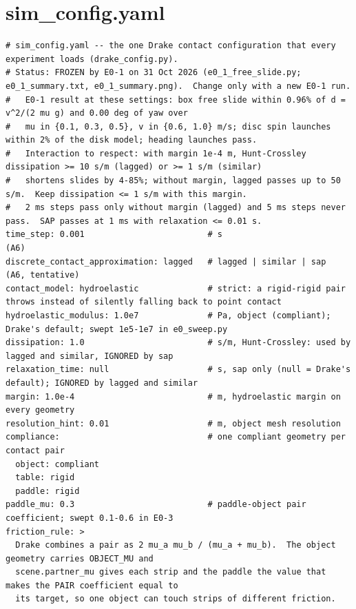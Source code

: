 \documentclass[10pt]{article}
\begin{document}
\section{sim\_config.yaml}
\begin{verbatim}
# sim_config.yaml -- the one Drake contact configuration that every experiment loads (drake_config.py).
# Status: FROZEN by E0-1 on 31 Oct 2026 (e0_1_free_slide.py; e0_1_summary.txt, e0_1_summary.png).  Change only with a new E0-1 run.
#   E0-1 result at these settings: box free slide within 0.96% of d = v^2/(2 mu g) and 0.00 deg of yaw over
#   mu in {0.1, 0.3, 0.5}, v in {0.6, 1.0} m/s; disc spin launches within 2% of the disk model; heading launches pass.
#   Interaction to respect: with margin 1e-4 m, Hunt-Crossley dissipation >= 10 s/m (lagged) or >= 1 s/m (similar)
#   shortens slides by 4-85%; without margin, lagged passes up to 50 s/m.  Keep dissipation <= 1 s/m with this margin.
#   2 ms steps pass only without margin (lagged) and 5 ms steps never pass.  SAP passes at 1 ms with relaxation <= 0.01 s.
time_step: 0.001                         # s                          (A6)
discrete_contact_approximation: lagged   # lagged | similar | sap     (A6, tentative)
contact_model: hydroelastic              # strict: a rigid-rigid pair throws instead of silently falling back to point contact
hydroelastic_modulus: 1.0e7              # Pa, object (compliant); Drake's default; swept 1e5-1e7 in e0_sweep.py
dissipation: 1.0                         # s/m, Hunt-Crossley: used by lagged and similar, IGNORED by sap
relaxation_time: null                    # s, sap only (null = Drake's default); IGNORED by lagged and similar
margin: 1.0e-4                           # m, hydroelastic margin on every geometry
resolution_hint: 0.01                    # m, object mesh resolution
compliance:                              # one compliant geometry per contact pair
  object: compliant
  table: rigid
  paddle: rigid
paddle_mu: 0.3                           # paddle-object pair coefficient; swept 0.1-0.6 in E0-3
friction_rule: >
  Drake combines a pair as 2 mu_a mu_b / (mu_a + mu_b).  The object geometry carries OBJECT_MU and
  scene.partner_mu gives each strip and the paddle the value that makes the PAIR coefficient equal to
  its target, so one object can touch strips of different friction.
\end{verbatim}
\end{document}
